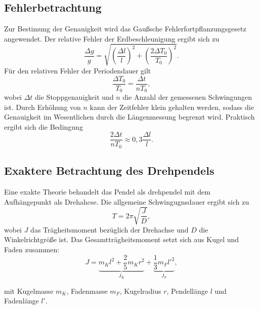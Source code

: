 \subsection{Fehlerbetrachtung}
Zur Bestimung der Genauigkeit wird das Gaußsche Fehlerfortpflanzungsgesetz angewendet. Der relative Fehler der Erdbeschleunigung ergibt sich zu
\begin{equation}
    \frac{\Delta g}{g} = \sqrt{\left(\frac{\Delta l}{l}\right)^2 + \left(\frac{2\Delta T_0}{T_0}\right)^2}.
    \label{eq:fehler_g}
\end{equation}
Für den relativen Fehler der Periodendauer gilt
\begin{equation}
    \frac{\Delta T_0}{T_0} = \frac{\Delta t}{n T_0},
    \label{eq:fehler_T}
\end{equation}
wobei $\Delta t$ die Stoppgenauigkeit und $n$ die Anzahl der gemessenen Schwingungen ist. Durch Erhöhung von $n$ kann der Zeitfehler klein gehalten werden, sodass die Genauigkeit im Wesentlichen durch die Längenmessung begrenzt wird. Praktisch ergibt sich die Bedingung
\begin{equation}
    \frac{2 \Delta t}{n T_0} \approx 0{,}3 \frac{\Delta l}{l}.
    \label{eq:bedingung_n}
\end{equation}

\subsection{Exaktere Betrachtung des Drehpendels}
Eine exakte Theorie behandelt das Pendel als drehpendel mit dem Aufhängepunkt als Drehahcse. Die allgemeine Schwingugnsdauer ergibt sich zu
\begin{equation}
    T = 2\pi \sqrt{\frac{J}{D}},
    \label{eq:T_drehpendel}
\end{equation}
wobei $J$ das Trägheitsmoment bezüglich der Drehachse und $D$ die Winkelrichtgröße ist. Das Gesamtträgheitsmoment setzt sich aus Kugel und Faden zusammen:
\begin{equation}
    J = \underbrace{m_K l^2 + \frac{2}{5} m_K r^2}_{J_K} 
      + \underbrace{\frac{1}{3} m_F l'^2}_{J_F},
    \label{eq:J}
\end{equation}

mit Kugelmasse $m_K$, Fadenmasse $m_F$, Kugelradius $r$, Pendellänge $l$ und Fadenlänge $l'$.


